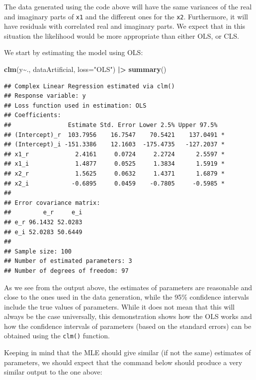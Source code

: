 \documentclass[
]{book}
\newenvironment{Shaded}{\begin{snugshade}}{\end{snugshade}}
\newcommand{\DataTypeTok}[1]{\textcolor[rgb]{0.13,0.29,0.53}{#1}}
\newcommand{\ErrorTok}[1]{\textcolor[rgb]{0.64,0.00,0.00}{\textbf{#1}}}
\newcommand{\KeywordTok}[1]{\textcolor[rgb]{0.13,0.29,0.53}{\textbf{#1}}}
\newcommand{\NormalTok}[1]{#1}
\newcommand{\OperatorTok}[1]{\textcolor[rgb]{0.81,0.36,0.00}{\textbf{#1}}}
\newcommand{\StringTok}[1]{\textcolor[rgb]{0.31,0.60,0.02}{#1}}
\begin{document}
The data generated using the code above will have the same variances of the real and imaginary parts of \texttt{x1} and the different ones for the \texttt{x2}. Furthermore, it will have residuals with correlated real and imaginary parts. We expect that in this situation the likelihood would be more appropriate than either OLS, or CLS.

We start by estimating the model using OLS:

\begin{Shaded}
\begin{Highlighting}[]
\KeywordTok{clm}\NormalTok{(y}\OperatorTok{\textasciitilde{}}\NormalTok{., dataArtificial, }\DataTypeTok{loss=}\StringTok{"OLS"}\NormalTok{) }\OperatorTok{|}\ErrorTok{\textgreater{}}
\StringTok{    }\KeywordTok{summary}\NormalTok{()}
\end{Highlighting}
\end{Shaded}

\begin{verbatim}
## Complex Linear Regression estimated via clm()
## Response variable: y
## Loss function used in estimation: OLS
## Coefficients:
##                Estimate Std. Error Lower 2.5% Upper 97.5%  
## (Intercept)_r  103.7956    16.7547    70.5421    137.0491 *
## (Intercept)_i -151.3386    12.1603  -175.4735   -127.2037 *
## x1_r             2.4161     0.0724     2.2724      2.5597 *
## x1_i             1.4877     0.0525     1.3834      1.5919 *
## x2_r             1.5625     0.0632     1.4371      1.6879 *
## x2_i            -0.6895     0.0459    -0.7805     -0.5985 *
## 
## Error covariance matrix:
##         e_r     e_i
## e_r 96.1432 52.0283
## e_i 52.0283 50.6449
## 
## Sample size: 100
## Number of estimated parameters: 3
## Number of degrees of freedom: 97
\end{verbatim}

As we see from the output above, the estimates of parameters are reasonable and close to the ones used in the data generation, while the 95\% confidence intervals include the true values of parameters. While it does not mean that this will always be the case universally, this demonstration shows how the OLS works and how the confidence intervals of parameters (based on the standard errors) can be obtained using the \texttt{clm()} function.

Keeping in mind that the MLE should give similar (if not the same) estimates of parameters, we should expect that the command below should produce a very similar output to the one above:
\end{document}
